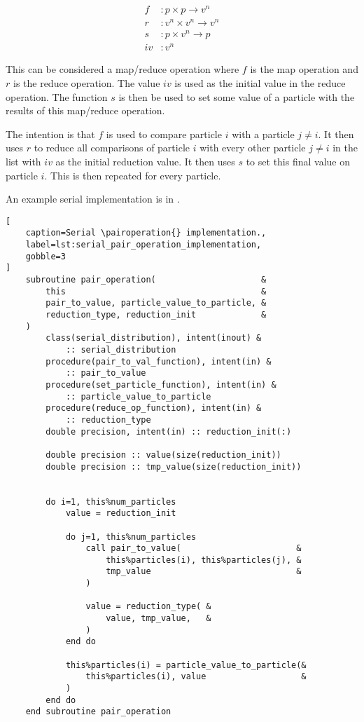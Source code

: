\begin{equation}
    \begin{split}
        f &: p\times{}p \rightarrow{} v^n \\
        r &: v^n\times{}v^n \rightarrow{} v^n \\
        s &: p\times{}v^n \rightarrow{} p \\
        iv &: v^n
    \end{split}
\end{equation}

This can be considered a map/reduce operation where $f$ is the map operation
and $r$ is the reduce operation.
%
The value $iv$ is used as the initial value in the reduce operation.
%
The function $s$ is then be used to set some value of a particle with
the results of this map/reduce operation.

The intention is that $f$ is used to compare particle $i$ with
a particle $j \ne{} i$.
%
It then uses $r$ to reduce all comparisons of particle $i$ with
every other particle $j\ne{}i$  in the list with
$iv$ as the initial reduction value.
%
It then uses $s$ to set this final value on particle $i$.
%
This is then repeated for every particle.

An example serial implementation is in
.

\begin{lstlisting}[
    caption=Serial \pairoperation{} implementation.,
    label=lst:serial_pair_operation_implementation,
    gobble=3
]
    subroutine pair_operation(                     &
        this                                       &
        pair_to_value, particle_value_to_particle, &
        reduction_type, reduction_init             &
    )
        class(serial_distribution), intent(inout) &
            :: serial_distribution
        procedure(pair_to_val_function), intent(in) &
            :: pair_to_value
        procedure(set_particle_function), intent(in) &
            :: particle_value_to_particle
        procedure(reduce_op_function), intent(in) &
            :: reduction_type
        double precision, intent(in) :: reduction_init(:)

        double precision :: value(size(reduction_init))
        double precision :: tmp_value(size(reduction_init))


        do i=1, this%num_particles
            value = reduction_init

            do j=1, this%num_particles
                call pair_to_value(                       &
                    this%particles(i), this%particles(j), &
                    tmp_value                             &
                )

                value = reduction_type( &
                    value, tmp_value,   &
                )
            end do

            this%particles(i) = particle_value_to_particle(&
                this%particles(i), value                   &
            )
        end do
    end subroutine pair_operation
\end{lstlisting}

